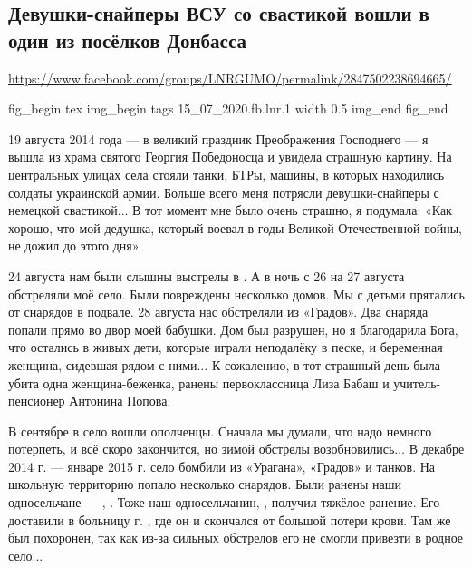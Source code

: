  
 
  
\subsection{Девушки-снайперы ВСУ со свастикой вошли в один из посёлков Донбасса}
\label{sec:15_07_2020.fb.lnr.1}
\url{https://www.facebook.com/groups/LNRGUMO/permalink/2847502238694665/}

\cite{15_07_2020.fb.lnr.1}

\ifcmt
fig_begin 
	tex \centering
  img_begin 
    tags 15_07_2020.fb.lnr.1
    width 0.5
  img_end
fig_end
\fi



19 августа 2014 года --- в великий праздник Преображения Господнего --- я вышла из
храма святого Георгия Победоносца и увидела страшную картину. На центральных
улицах села стояли танки, БТРы, машины, в которых находились солдаты украинской
армии. Больше всего меня потрясли девушки-снайперы с немецкой свастикой... В
тот момент мне было очень страшно, я подумала: «Как хорошо, что мой дедушка,
который воевал в годы Великой Отечественной войны, не дожил до этого дня».

24 августа нам были слышны выстрелы в . А в ночь с 26 на 27
августа обстреляли моё село. Были повреждены несколько домов. Мы с детьми
прятались от снарядов в подвале. 28 августа нас обстреляли из «Градов». Два
снаряда попали прямо во двор моей бабушки. Дом был разрушен, но я благодарила
Бога, что остались в живых дети, которые играли неподалёку в песке, и
беременная женщина, сидевшая рядом с ними$\ldots$ К сожалению, в тот страшный день
была убита одна женщина-беженка, ранены первоклассница Лиза Бабаш и
учитель-пенсионер Антонина Попова.


В сентябре в село вошли ополченцы. Сначала мы думали, что надо немного
потерпеть, и всё скоро закончится, но зимой обстрелы возобновились$\ldots$ В декабре
2014 г. --- январе 2015 г. село бомбили из «Урагана», «Градов» и танков. На
школьную территорию попало несколько снарядов. Были ранены наши односельчане ---
, . Тоже наш односельчанин, 
, получил тяжёлое ранение. Его доставили в больницу г. , где
он и скончался от большой потери крови. Там же был похоронен, так как из-за
сильных обстрелов его не смогли привезти в родное село...

